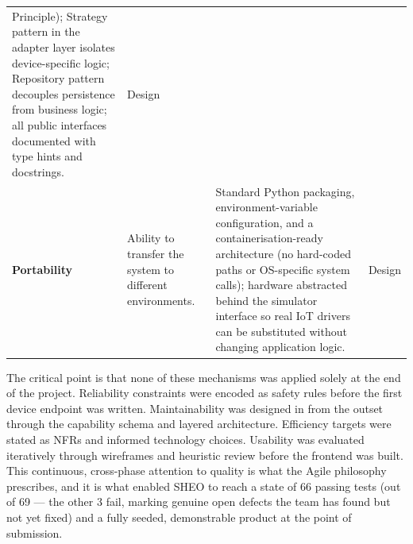 \begin{xltabular}{\linewidth}{@{} l Y Y l @{}}
  Principle); Strategy pattern in the adapter layer isolates device-specific logic;
  Repository pattern decouples persistence from business logic; all public interfaces
  documented with type hints and docstrings. &
  Design \\
\addlinespace
\textbf{Portability} &
  Ability to transfer the system to different environments. &
  Standard Python packaging, environment-variable configuration, and a
  containerisation-ready architecture (no hard-coded paths or OS-specific system calls);
  hardware abstracted behind the simulator interface so real IoT drivers can be substituted
  without changing application logic. &
  Design \\
\bottomrule
\end{xltabular}

\bigskip

The critical point is that none of these mechanisms was applied solely at the end of the
project. Reliability constraints were encoded as safety rules before the first device
endpoint was written. Maintainability was designed in from the outset through the capability
schema and layered architecture. Efficiency targets were stated as NFRs and informed
technology choices. Usability was evaluated iteratively through wireframes and heuristic
review before the frontend was built. This continuous, cross-phase attention to quality is
what the Agile philosophy prescribes, and it is what enabled SHEO to
reach a state of 66 passing tests (out of 69 --- the other 3 fail, marking genuine
open defects the team has found but not yet fixed) and a fully seeded, demonstrable
product at the point of submission.
